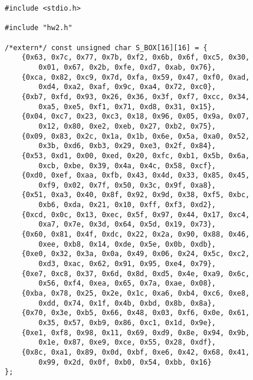 \documentclass[a4paper]{report}
\begin{document}
\begin{lstlisting}
#include <stdio.h>

#include "hw2.h"

/*extern*/ const unsigned char S_BOX[16][16] = {
    {0x63, 0x7c, 0x77, 0x7b, 0xf2, 0x6b, 0x6f, 0xc5, 0x30,
        0x01, 0x67, 0x2b, 0xfe, 0xd7, 0xab, 0x76},
    {0xca, 0x82, 0xc9, 0x7d, 0xfa, 0x59, 0x47, 0xf0, 0xad,
        0xd4, 0xa2, 0xaf, 0x9c, 0xa4, 0x72, 0xc0},
    {0xb7, 0xfd, 0x93, 0x26, 0x36, 0x3f, 0xf7, 0xcc, 0x34,
        0xa5, 0xe5, 0xf1, 0x71, 0xd8, 0x31, 0x15},
    {0x04, 0xc7, 0x23, 0xc3, 0x18, 0x96, 0x05, 0x9a, 0x07,
        0x12, 0x80, 0xe2, 0xeb, 0x27, 0xb2, 0x75},
    {0x09, 0x83, 0x2c, 0x1a, 0x1b, 0x6e, 0x5a, 0xa0, 0x52,
        0x3b, 0xd6, 0xb3, 0x29, 0xe3, 0x2f, 0x84},
    {0x53, 0xd1, 0x00, 0xed, 0x20, 0xfc, 0xb1, 0x5b, 0x6a,
        0xcb, 0xbe, 0x39, 0x4a, 0x4c, 0x58, 0xcf},
    {0xd0, 0xef, 0xaa, 0xfb, 0x43, 0x4d, 0x33, 0x85, 0x45,
        0xf9, 0x02, 0x7f, 0x50, 0x3c, 0x9f, 0xa8},
    {0x51, 0xa3, 0x40, 0x8f, 0x92, 0x9d, 0x38, 0xf5, 0xbc,
        0xb6, 0xda, 0x21, 0x10, 0xff, 0xf3, 0xd2},
    {0xcd, 0x0c, 0x13, 0xec, 0x5f, 0x97, 0x44, 0x17, 0xc4,
        0xa7, 0x7e, 0x3d, 0x64, 0x5d, 0x19, 0x73},
    {0x60, 0x81, 0x4f, 0xdc, 0x22, 0x2a, 0x90, 0x88, 0x46,
        0xee, 0xb8, 0x14, 0xde, 0x5e, 0x0b, 0xdb},
    {0xe0, 0x32, 0x3a, 0x0a, 0x49, 0x06, 0x24, 0x5c, 0xc2,
        0xd3, 0xac, 0x62, 0x91, 0x95, 0xe4, 0x79},
    {0xe7, 0xc8, 0x37, 0x6d, 0x8d, 0xd5, 0x4e, 0xa9, 0x6c,
        0x56, 0xf4, 0xea, 0x65, 0x7a, 0xae, 0x08},
    {0xba, 0x78, 0x25, 0x2e, 0x1c, 0xa6, 0xb4, 0xc6, 0xe8,
        0xdd, 0x74, 0x1f, 0x4b, 0xbd, 0x8b, 0x8a},
    {0x70, 0x3e, 0xb5, 0x66, 0x48, 0x03, 0xf6, 0x0e, 0x61,
        0x35, 0x57, 0xb9, 0x86, 0xc1, 0x1d, 0x9e},
    {0xe1, 0xf8, 0x98, 0x11, 0x69, 0xd9, 0x8e, 0x94, 0x9b,
        0x1e, 0x87, 0xe9, 0xce, 0x55, 0x28, 0xdf},
    {0x8c, 0xa1, 0x89, 0x0d, 0xbf, 0xe6, 0x42, 0x68, 0x41,
        0x99, 0x2d, 0x0f, 0xb0, 0x54, 0xbb, 0x16}
};


\end{lstlisting}
\end{document}
